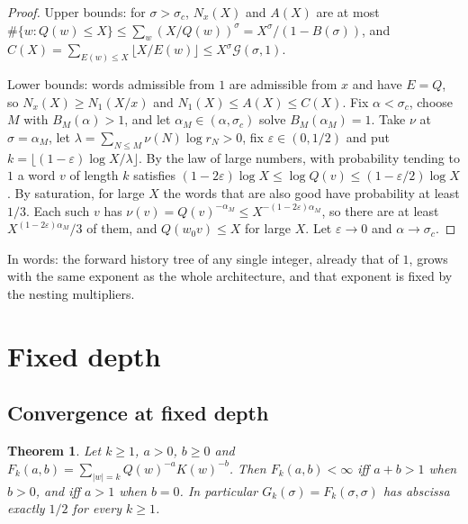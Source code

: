 \documentclass[11pt,a4paper]{article}
\newtheorem{theorem}{Theorem}[section]
\begin{document}
\begin{proof}

Upper bounds: for \(\sigma>\sigma_c\), \(N_x(X)\) and \(A(X)\) are at
most
\(\#\{w:Q(w)\le X\}\le\sum_w(X/Q(w))^{\sigma}=X^{\sigma}/(1-B(\sigma))\),
and
\(C(X)=\sum_{E(w)\le X}\lfloor X/E(w)\rfloor\le X^{\sigma}\mathcal G(\sigma,1)\).

Lower bounds: words admissible from \(1\) are admissible from \(x\) and
have \(E=Q\), so \(N_x(X)\ge N_1(X/x)\) and \(N_1(X)\le A(X)\le C(X)\).
Fix \(\alpha<\sigma_c\), choose \(M\) with \(B_M(\alpha)>1\), and let
\(\alpha_M\in(\alpha,\sigma_c)\) solve \(B_M(\alpha_M)=1\). Take \(\nu\)
at \(\sigma=\alpha_M\), let \(\lambda=\sum_{N\le M}\nu(N)\log r_N>0\),
fix \(\varepsilon\in(0,1/2)\) and put
\(k=\lfloor(1-\varepsilon)\log X/\lambda\rfloor\). By the law of large
numbers, with probability tending to \(1\) a word \(v\) of length \(k\)
satisfies
\((1-2\varepsilon)\log X\le\log Q(v)\le(1-\varepsilon/2)\log X\). By
saturation, for large \(X\) the words that are also good have
probability at least \(1/3\). Each such \(v\) has
\(\nu(v)=Q(v)^{-\alpha_M}\le X^{-(1-2\varepsilon)\alpha_M}\), so there
are at least \(X^{(1-2\varepsilon)\alpha_M}/3\) of them, and
\(Q(w_0v)\le X\) for large \(X\). Let \(\varepsilon\to0\) and
\(\alpha\to\sigma_c\).

\end{proof}

In words: the forward history tree of any single integer, already that
of \(1\), grows with the same exponent as the whole architecture, and
that exponent is fixed by the nesting multipliers.

\section{Fixed depth}

\subsection{Convergence at fixed
depth}

\begin{theorem}\label{thm:fixed}
Let \(k\ge1\), \(a>0\), \(b\ge0\) and
\(F_k(a,b)=\sum_{|w|=k}Q(w)^{-a}K(w)^{-b}\). Then \(F_k(a,b)<\infty\)
iff \(a+b>1\) when \(b>0\), and iff \(a>1\) when \(b=0\). In particular
\(G_k(\sigma)=F_k(\sigma,\sigma)\) has abscissa exactly \(1/2\) for
every \(k\ge1\).

\end{theorem}
\end{document}
